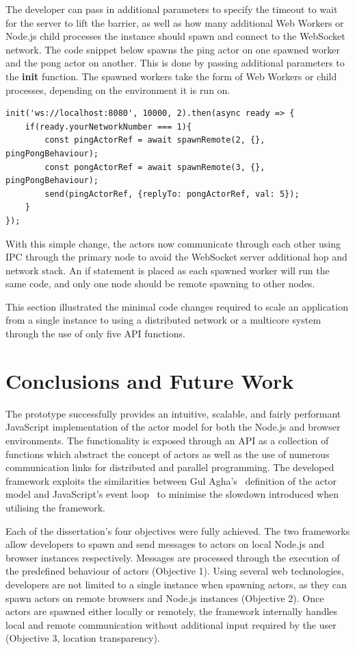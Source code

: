 \documentclass[oneside]{um-fict}
\begin{document}
The developer can pass in additional parameters to specify the timeout to wait for the server to lift the barrier, as well as how many additional Web Workers or Node.js child processes the instance should spawn and connect to the WebSocket network. The code snippet below spawns the ping actor on one spawned worker and the pong actor on another. This is done by passing additional parameters to the \textbf{init} function. The spawned workers take the form of Web Workers or child processes, depending on the environment it is run on.
\begin{lstlisting}
init('ws://localhost:8080', 10000, 2).then(async ready => {
    if(ready.yourNetworkNumber === 1){
        const pingActorRef = await spawnRemote(2, {}, pingPongBehaviour);
        const pongActorRef = await spawnRemote(3, {}, pingPongBehaviour);
        send(pingActorRef, {replyTo: pongActorRef, val: 5});
    }
});
\end{lstlisting}
With this simple change, the actors now communicate through each other using IPC through the primary node to avoid the WebSocket server additional hop and network stack. An if statement is placed as each spawned worker will run the same code, and only one node should be remote spawning to other nodes.

This section illustrated the minimal code changes required to scale an application from a single instance to using a distributed network or a multicore system through the use of only five API functions.
\chapter{Conclusions and Future Work}\label{chap:conclusions}
The prototype successfully provides an intuitive, scalable, and fairly performant JavaScript implementation of the actor model for both the Node.js and browser environments. The functionality is exposed through an API as a collection of functions which abstract the concept of actors as well as the use of numerous communication links for distributed and parallel programming. The developed framework exploits the similarities between Gul Agha's~\cite{agha1985actors} definition of the actor model and JavaScript's event loop~\cite{eventloopbrowser, eventloopnode} to minimise the slowdown introduced when utilising the framework. 

Each of the dissertation's four objectives were fully achieved. The two frameworks allow developers to spawn and send messages to actors on local Node.js and browser instances respectively. Messages are processed through the execution of the predefined behaviour of actors (Objective 1). Using several web technologies, developers are not limited to a single instance when spawning actors, as they can spawn actors on remote browsers and Node.js instances (Objective 2). Once actors are spawned either locally or remotely, the framework internally handles local and remote communication without additional input required by the user (Objective 3, location transparency).
\end{document}

